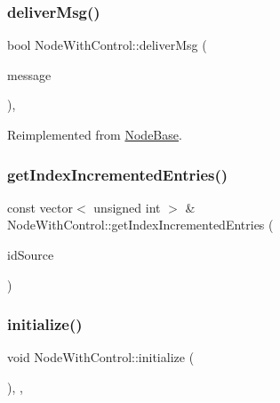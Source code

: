 \subsubsection{\texorpdfstring{deliver\+Msg()}{deliverMsg()}}
{\footnotesize\ttfamily bool Node\+With\+Control\+::deliver\+Msg (\begin{DoxyParamCaption}\item[{const \hyperlink{structures_8h_a7e7bdc1d2fff8a9436f2f352b2711ed6}{message\+Info} \&}]{message }\end{DoxyParamCaption})\hspace{0.3cm}{\ttfamily [protected]}, {\ttfamily [virtual]}}



Reimplemented from \hyperlink{class_node_base_a49052382add1123da26db6bfb687d254}{Node\+Base}.

\mbox{\label{class_node_with_control_acf1daba46cfa16eb2bd7cbd399c2624b}} 
\subsubsection{\texorpdfstring{get\+Index\+Incremented\+Entries()}{getIndexIncrementedEntries()}}
{\footnotesize\ttfamily const vector$<$ unsigned int $>$ \& Node\+With\+Control\+::get\+Index\+Incremented\+Entries (\begin{DoxyParamCaption}\item[{unsigned int}]{id\+Source }\end{DoxyParamCaption})\hspace{0.3cm}{\ttfamily [protected]}}

\mbox{\label{class_node_with_control_a08c8e80fd67b52c51c642d7c66fe729c}} 
\subsubsection{\texorpdfstring{initialize()}{initialize()}}
{\footnotesize\ttfamily void Node\+With\+Control\+::initialize (\begin{DoxyParamCaption}{ }\end{DoxyParamCaption})\hspace{0.3cm}{\ttfamily [override]}, {\ttfamily [protected]}, {\ttfamily [virtual]}}



